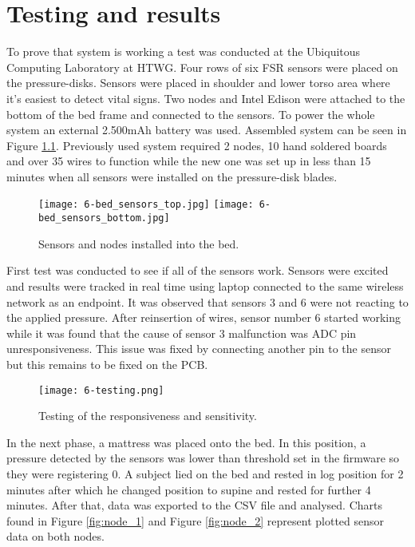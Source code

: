 \chapter{Testing and results}
\label{chap:results}

To prove that system is working a test was conducted at the Ubiquitous Computing Laboratory at \ac{HTWG}. Four rows of six \ac{FSR} sensors were placed on the pressure-disks. Sensors were placed in shoulder and lower torso area where it's easiest to detect vital signs. Two nodes and Intel Edison were attached to the bottom of the bed frame and connected to the sensors. To power the whole system an external 2.500mAh battery was used. Assembled system can be seen in Figure \ref{fig:bed_sensors}. Previously used system required 2 nodes, 10 hand soldered boards and over 35 wires to function while the new one was set up in less than 15 minutes when all sensors were installed on the pressure-disk blades.

\begin{figure}[h]
  \begin{center}
    \texttt{[image: 6-bed\_sensors\_top.jpg]}
    \vspace{0.5cm}
    \texttt{[image: 6-bed\_sensors\_bottom.jpg]}
  \end{center}
  \caption{Sensors and nodes installed into the bed.}
  \label{fig:bed_sensors}
\end{figure}

First test was conducted to see if all of the sensors work. Sensors were excited and results were tracked in real time using laptop connected to the same wireless network as an endpoint. It was observed that sensors 3 and 6 were not reacting to the applied pressure. After reinsertion of wires, sensor number 6 started working while it was found that the cause of sensor 3 malfunction was \ac{ADC} pin unresponsiveness. This issue was fixed by connecting another pin to the sensor but this remains to be fixed on the \ac{PCB}.

\begin{figure}[h]
  \begin{center}
    \texttt{[image: 6-testing.png]}
  \end{center}
  \caption{Testing of the responsiveness and sensitivity.}
  \label{fig:testing}
\end{figure}

In the next phase, a mattress was placed onto the bed. In this position, a pressure detected by the sensors was lower than threshold set in the firmware so they were registering 0. A subject lied on the bed and rested in log position for 2 minutes after which he changed position to supine and rested for further 4 minutes. After that, data was exported to the CSV file and analysed. Charts found in Figure \ref{fig:node_1} and Figure \ref{fig:node_2} represent plotted sensor data on both nodes.

